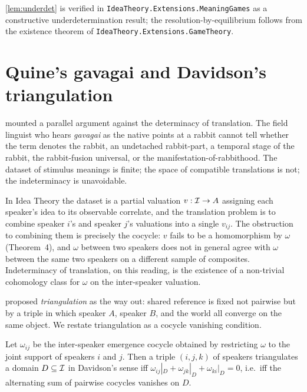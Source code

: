 \formalstatus \cref{lem:underdet} is verified in
\texttt{IdeaTheory.Extensions.MeaningGames} as a constructive
underdetermination result; the resolution-by-equilibrium follows from
the existence theorem of \texttt{IdeaTheory.Extensions.GameTheory}.

\section{Quine's gavagai and Davidson's triangulation}\label{sec:quine}

\cite{Quine1960} mounted a parallel argument against the determinacy of
translation. The field linguist who hears \emph{gavagai} as the native
points at a rabbit cannot tell whether the term denotes the rabbit, an
undetached rabbit-part, a temporal stage of the rabbit, the rabbit-fusion
universal, or the manifestation-of-rabbithood. The dataset of stimulus
meanings is finite; the space of compatible translations is not; the
indeterminacy is unavoidable.

In Idea Theory the dataset is a partial valuation
$v:\mathcal{I}\to A$ assigning each speaker's idea to its observable
correlate, and the translation problem is to combine speaker $i$'s and
speaker $j$'s valuations into a single $v_{ij}$. The obstruction to
combining them is precisely the cocycle: $v$ fails to be a
homomorphism by $\omega$ (Theorem~4), and $\omega$ between two speakers
does not in general agree with $\omega$ between the same two speakers
on a different sample of composites. Indeterminacy of translation, on
this reading, is the existence of a non-trivial cohomology class for
$\omega$ on the inter-speaker valuation.

\cite{Davidson1991} proposed \emph{triangulation} as the way out:
shared reference is fixed not pairwise but by a triple in which
speaker $A$, speaker $B$, and the world all converge on the same
object. We restate triangulation as a cocycle vanishing condition.

\begin{theorem}\label{thm:triangulation}
Let $\omega_{ij}$ be the inter-speaker emergence cocycle obtained by
restricting $\omega$ to the joint support of speakers $i$ and $j$.
Then a triple $(i,j,k)$ of speakers triangulates a domain
$D\subseteq\mathcal{I}$ in Davidson's sense iff
$\omega_{ij}|_D + \omega_{jk}|_D + \omega_{ki}|_D = 0$, i.e.\ iff
the alternating sum of pairwise cocycles vanishes on $D$.
\end{theorem}

